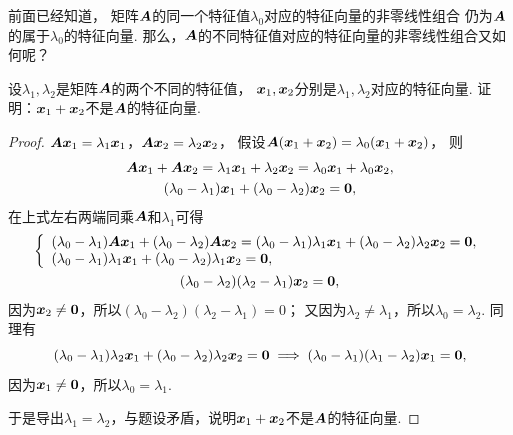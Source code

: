 前面已经知道，
矩阵\(\boldsymbol{A}\)的同一个特征值\(\lambda_0\)对应的特征向量的非零线性组合
仍为\(\boldsymbol{A}\)的属于\(\lambda_0\)的特征向量.
那么，\(\boldsymbol{A}\)的不同特征值对应的特征向量的非零线性组合又如何呢？
\begin{example}
设\(\lambda_1,\lambda_2\)是矩阵\(\boldsymbol{A}\)的两个不同的特征值，
\(\boldsymbol{x}_1,\boldsymbol{x}_2\)分别是\(\lambda_1,\lambda_2\)对应的特征向量.
证明：\(\boldsymbol{x}_1+\boldsymbol{x}_2\)不是\(\boldsymbol{A}\)的特征向量.
\begin{proof}
\(\boldsymbol{A}\boldsymbol{x}_1 = \lambda_1\boldsymbol{x}_1\)，\(\boldsymbol{A}\boldsymbol{x}_2 = \lambda_2\boldsymbol{x}_2\)，
假设\(\boldsymbol{A}(\boldsymbol{x}_1+\boldsymbol{x}_2) = \lambda_0(\boldsymbol{x}_1+\boldsymbol{x}_2)\)，
则\begin{gather*}
	\boldsymbol{A}\boldsymbol{x}_1+\boldsymbol{A}\boldsymbol{x}_2 =\lambda_1\boldsymbol{x}_1+\lambda_2\boldsymbol{x}_2 = \lambda_0\boldsymbol{x}_1+\lambda_0\boldsymbol{x}_2, \\
	(\lambda_0-\lambda_1)\boldsymbol{x}_1+(\lambda_0-\lambda_2)\boldsymbol{x}_2 = \boldsymbol0,
\end{gather*}
在上式左右两端同乘\(\boldsymbol{A}\)和\(\lambda_1\)可得\begin{gather*}
	\left\{ \begin{array}{l}
		(\lambda_0-\lambda_1)\boldsymbol{A}\boldsymbol{x}_1+(\lambda_0-\lambda_2)\boldsymbol{A}\boldsymbol{x}_2 = (\lambda_0-\lambda_1)\lambda_1\boldsymbol{x}_1 + (\lambda_0-\lambda_2)\lambda_2\boldsymbol{x}_2 = \boldsymbol0, \\
		(\lambda_0-\lambda_1)\lambda_1\boldsymbol{x}_1+(\lambda_0-\lambda_2)\lambda_1\boldsymbol{x}_2 = \boldsymbol0,
	\end{array} \right. \\
	(\lambda_0-\lambda_2)(\lambda_2-\lambda_1)\boldsymbol{x}_2 = \boldsymbol0,
\end{gather*}
因为\(\boldsymbol{x}_2\neq\boldsymbol0\)，所以\((\lambda_0-\lambda_2)(\lambda_2-\lambda_1)=0\)；
又因为\(\lambda_2\neq\lambda_1\)，所以\(\lambda_0=\lambda_2\).
同理有\begin{equation*}
	(\lambda_0-\lambda_1)\lambda_2\boldsymbol{x}_1+(\lambda_0-\lambda_2)\lambda_2\boldsymbol{x}_2 = \boldsymbol0
	\implies
	(\lambda_0-\lambda_1)(\lambda_1-\lambda_2)\boldsymbol{x}_1 = \boldsymbol0,
\end{equation*}
因为\(\boldsymbol{x}_1\neq\boldsymbol0\)，所以\(\lambda_0=\lambda_1\).

于是导出\(\lambda_1=\lambda_2\)，与题设矛盾，说明\(\boldsymbol{x}_1+\boldsymbol{x}_2\)不是\(\boldsymbol{A}\)的特征向量.
\end{proof}
\end{example}

